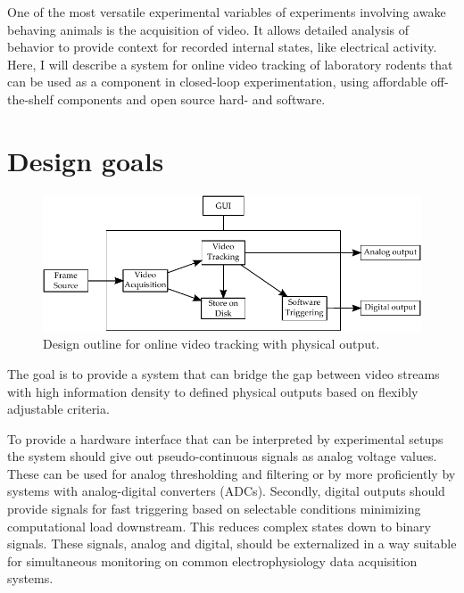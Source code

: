 One of the most versatile experimental variables of experiments involving awake behaving animals is the acquisition of video. It allows detailed analysis of behavior to provide context for recorded internal states, like electrical activity. Here, I will describe a system for online video tracking of laboratory rodents that can be used as a component in closed-loop experimentation, using affordable off-the-shelf components and open source hard- and software.

\newpage
\section{Design goals}
\label{sec:design}
\begin{figure}
	\centering
		\includegraphics [width=\linewidth]{gfx/SpotterDesign.pdf} %
	\caption[Test]{Design outline for online video tracking with physical output.}
	\label{fig:design}
\end{figure}

The goal is to provide a system that can bridge the gap between video streams with high information density to defined physical outputs based on flexibly adjustable criteria.

To provide a hardware interface that can be interpreted by experimental setups the system should give out pseudo-continuous signals as analog voltage values. These can be used for analog thresholding and filtering or by more proficiently by systems with analog-digital converters (ADCs). Secondly, digital outputs should provide signals for fast triggering based on selectable conditions minimizing computational load downstream. This reduces complex states down to binary signals. These signals, analog and digital, should be externalized in a way suitable for simultaneous monitoring on common electrophysiology data acquisition systems.

